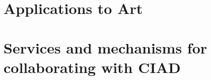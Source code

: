 \begin{bibliographysection}
\part{Applications to Art}

\localized

\part{Services and mechanisms for collaborating with CIAD}

\localized
\localized

\localized

\appendix

\end{bibliographysection}

\endinput
